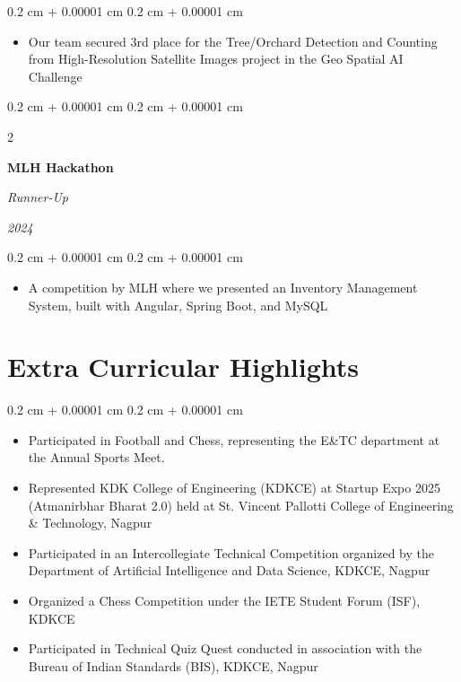 \documentclass[10pt, letterpaper]{article}
\newenvironment{highlights}{
    \begin{itemize}[
        topsep=0.10 cm,
        parsep=0.10 cm,
        partopsep=0pt,
        itemsep=0pt,
        leftmargin=0.4 cm + 10pt
    ]
}{
    \end{itemize}
} %
\newenvironment{onecolentry}{
    \begin{adjustwidth}{
        0.2 cm + 0.00001 cm
    }{
        0.2 cm + 0.00001 cm
    }
}{
    \end{adjustwidth}
} %
\newenvironment{twocolentry}[2][]{
    \onecolentry
    \def\secondColumn{#2}
    \setcolumnwidth{\fill, 4.5 cm}
    \begin{paracol}{2}
}{
    \switchcolumn \raggedleft \secondColumn
    \end{paracol}
    \endonecolentry
} %
\begin{document}
        \vspace{0.10 cm}
        \begin{onecolentry}
            \begin{highlights}
                \item Our team secured 3rd place for the Tree/Orchard Detection and Counting from High-Resolution Satellite Images project in the Geo Spatial AI Challenge
            \end{highlights}
        \end{onecolentry}


        \vspace{0.2 cm}

        \begin{twocolentry}{
        \textit{2024}}
            \textbf{MLH Hackathon}
            
            \textit{Runner-Up}
        \end{twocolentry}

        \vspace{0.10 cm}
        \begin{onecolentry}
            \begin{highlights}
                \item A competition by MLH where we presented an Inventory Management System, built with Angular, Spring Boot, and MySQL
            \end{highlights}
        \end{onecolentry}


    \section{Extra Curricular Highlights}


        \begin{onecolentry}
            \begin{highlights}
                \item Participated in Football and Chess, representing the E\&TC department at the Annual Sports Meet.
                \item Represented KDK College of Engineering (KDKCE) at Startup Expo 2025 (Atmanirbhar Bharat 2.0) held at St. Vincent Pallotti College of Engineering \& Technology, Nagpur
                \item Participated in an Intercollegiate Technical Competition organized by the Department of Artificial Intelligence and Data Science, KDKCE, Nagpur
                \item Organized a Chess Competition under the IETE Student Forum (ISF), KDKCE
                \item Participated in Technical Quiz Quest conducted in association with the Bureau of Indian Standards (BIS), KDKCE, Nagpur
            \end{highlights}
        \end{onecolentry}
\end{document}
